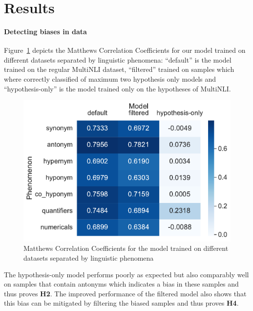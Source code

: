 \section{Results} \label{sec:results}

\paragraph{Detecting biases in data}
Figure~\ref{fig:metric-heatmap-phenomena-mcc} depicts the Matthews Correlation Coefficients for our model trained on different datasets separated by linguistic phenomena: \enquote{default} is the model trained on the regular \ac{MultiNLI} dataset, \enquote{filtered} trained on samples which where correctly classified of maximum two hypothesis only models and \enquote{hypothesis-only} is the model trained only on the hypotheses of \ac{MultiNLI}.

\begin{figure}[ht]
    \centering
    \includegraphics[width=0.9\columnwidth]{./images/metric_heatmaps_phenomena/important_words/matthews_correlation.pdf}
    \caption{Matthews Correlation Coefficients for the model trained on different datasets separated by linguistic phenomena}
    \label{fig:metric-heatmap-phenomena-mcc}
\end{figure}

The hypothesis-only model performs poorly as expected but also comparably well on samples that contain antonyms which indicates a bias in these samples and thus proves \textbf{H2}. The improved performance of the filtered model also shows that this bias can be mitigated by filtering the biased samples and thus proves \textbf{H4}.


